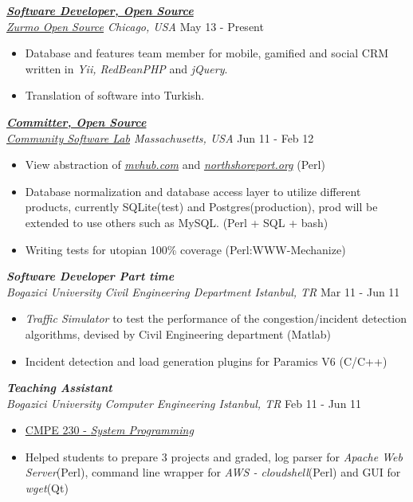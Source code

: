 \documentclass[line, margin]{res}
\begin{document}
\begin{resume}
  {\sl \textbf{\href{https://bitbucket.org/zurmo/}{Software Developer, Open Source}} \\ \href{http://zurmo.org}{Zurmo Open Source} Chicago, USA} \hfill May 13 - Present \\
  \vspace{-0.3cm}
  \begin{itemize}
    \item Database and features team member for mobile, gamified and social CRM written in   \textit{Yii, RedBeanPHP} and \textit{jQuery}.
    \item Translation of software into Turkish.
  \end{itemize}

	{\sl \textbf{\href{https://launchpad.net/mvhub}{Committer, Open Source}} \\ \href{http://thecsl.org/}{Community Software Lab} Massachusetts, USA} \hfill Jun 11 - Feb 12 \\
	\vspace{-0.3cm}
	\begin{itemize} \itemsep -2pt
		\item View abstraction of \textit{\href{http://mvhub.com/}{mvhub.com}} and \textit{\href{http://northshoreport.org/}{northshoreport.org}} (Perl)
		\item Database normalization and database access layer to utilize different products, currently SQLite(test) and Postgres(production), prod will be extended to use others such as MySQL. (Perl + SQL + bash)
		\item Writing tests for utopian 100\% coverage (Perl:WWW-Mechanize)
	\end{itemize}

	{\sl \textbf{Software Developer Part time} \\ Bogazici University Civil Engineering Department Istanbul, TR} \hfill Mar 11 - Jun 11 \\
	\vspace{-0.3cm}
	\begin{itemize} \itemsep -2pt
		\item \textit{Traffic Simulator} to test the performance of the congestion/incident detection algorithms, devised by Civil Engineering department (Matlab)
		\item Incident detection and load generation plugins for Paramics V6 (C/C++)
	\end{itemize}

	{\sl \textbf{Teaching Assistant} \\ Bogazici University Computer Engineering Istanbul, TR} \hfill Feb 11 - Jun 11 \\
	\vspace{-.3cm} 
	\begin{itemize} \itemsep -2pt
		\item \href{http://www.cmpe.boun.edu.tr/courses/?cmpe=230}{CMPE 230 - \textit{System Programming}}
		\item Helped students to prepare 3 projects and graded, log parser for \textit{Apache Web Server}(Perl), command line wrapper for \textit{AWS - cloudshell}(Perl) and GUI for \textit{wget}(Qt)
	\end{itemize}


\end{resume}
\end{document}
